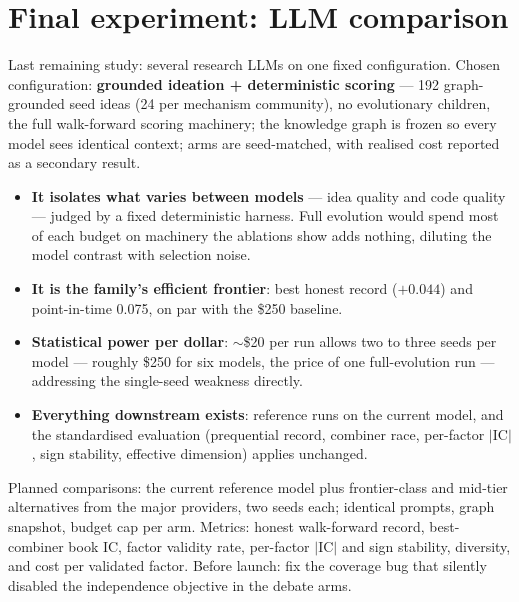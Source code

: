 \documentclass[11pt,a4paper]{article}
\begin{document}
\section*{Final experiment: LLM comparison}
Last remaining study: several research LLMs on one fixed configuration.
Chosen configuration: \textbf{grounded ideation + deterministic scoring} ---
192 graph-grounded seed ideas (24 per mechanism community), no evolutionary
children, the full walk-forward scoring machinery; the knowledge graph is
frozen so every model sees identical context; arms are seed-matched, with
realised cost reported as a secondary result.

\begin{itemize}
\item \textbf{It isolates what varies between models} --- idea quality and
code quality --- judged by a fixed deterministic harness. Full evolution
would spend most of each budget on machinery the ablations show adds
nothing, diluting the model contrast with selection noise.
\item \textbf{It is the family's efficient frontier}: best honest record
($+0.044$) and point-in-time 0.075, on par with the \$250 baseline.
\item \textbf{Statistical power per dollar}: $\sim$\$20 per run allows two
to three seeds per model --- roughly \$250 for six models, the price of one
full-evolution run --- addressing the single-seed weakness directly.
\item \textbf{Everything downstream exists}: reference runs on the current
model, and the standardised evaluation (prequential record, combiner race,
per-factor $|$IC$|$, sign stability, effective dimension) applies unchanged.
\end{itemize}

\noindent Planned comparisons: the current reference model plus
frontier-class and mid-tier alternatives from the major providers, two seeds
each; identical prompts, graph snapshot, budget cap per arm. Metrics: honest
walk-forward record, best-combiner book IC, factor validity rate, per-factor
$|$IC$|$ and sign stability, diversity, and cost per validated factor.
Before launch: fix the coverage bug that silently disabled the independence
objective in the debate arms.
\end{document}
